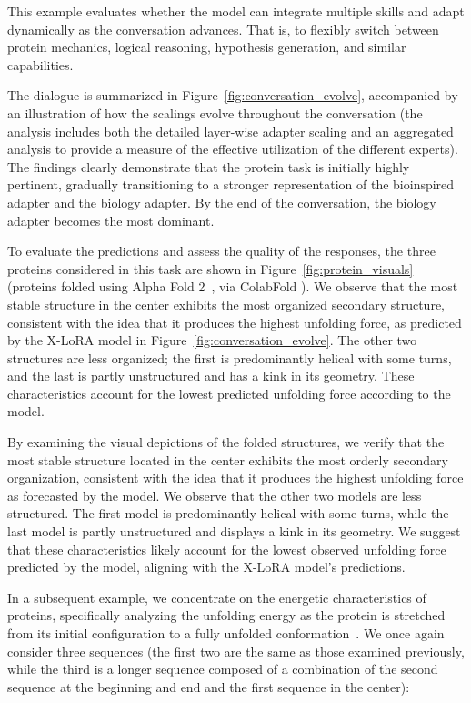 This example evaluates whether the model can integrate multiple skills and adapt dynamically as the conversation advances. That is, to flexibly switch between protein mechanics, logical reasoning, hypothesis generation, and similar capabilities.

The dialogue is summarized in Figure~\ref{fig:conversation_evolve}, accompanied by an illustration of how the scalings evolve throughout the conversation (the analysis includes both the detailed layer-wise adapter scaling and an aggregated analysis to provide a measure of the effective utilization of the different experts). The findings clearly demonstrate that the protein task is initially highly pertinent, gradually transitioning to a stronger representation of the bioinspired adapter and the biology adapter. By the end of the conversation, the biology adapter becomes the most dominant.

To evaluate the predictions and assess the quality of the responses, the three proteins considered in this task are shown in Figure~\ref{fig:protein_visuals} (proteins folded using Alpha Fold 2~\cite{Jumper2021HighlyAlphaFoldb}, via ColabFold \cite{Mirdita2022ColabFold:All}). We observe that the most stable structure in the center exhibits the most organized secondary structure, consistent with the idea that it produces the highest unfolding force, as predicted by the X-LoRA model in Figure~\ref{fig:conversation_evolve}. The other two structures are less organized; the first is predominantly helical with some turns, and the last is partly unstructured and has a kink in its geometry. These characteristics account for the lowest predicted unfolding force according to the model.

By examining the visual depictions of the folded structures, we verify that the most stable structure located in the center exhibits the most orderly secondary organization, consistent with the idea that it produces the highest unfolding force as forecasted by the model. We observe that the other two models are less structured. The first model is predominantly helical with some turns, while the last model is partly unstructured and displays a kink in its geometry. We suggest that these characteristics likely account for the lowest observed unfolding force predicted by the model, aligning with the X-LoRA model’s predictions.

In a subsequent example, we concentrate on the energetic characteristics of proteins, specifically analyzing the unfolding energy as the protein is stretched from its initial configuration to a fully unfolded conformation~\cite{Ni2023ForceGen:Model}. We once again consider three sequences (the first two are the same as those examined previously, while the third is a longer sequence composed of a combination of the second sequence at the beginning and end and the first sequence in the center):

